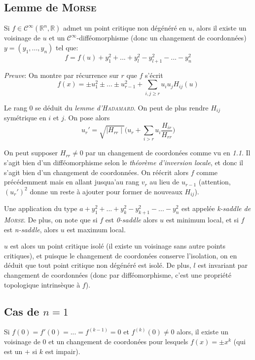 \documentclass{article}
\begin{document}
\subsection{Lemme de \textsc{Morse}}

Si $f\in\mathcal{C}^\infty(\mathbb{R}^n,\mathbb{R})$ admet un point critique non dégénéré en $u$, alors il existe un voisinage de $u$ et un $\mathcal{C}^\infty$-difféomorphisme (donc un changement de coordonnées) $y=(y_1,...,y_n)$ tel que: $$f=f(u)+y_1^2+...+y_l^2-y_{l+1}^2-...-y_n^2$$

\bigskip

\textit{Preuve}: On montre par récurrence sur $r$ que $f$ s'écrit $$f(x)=\pm u_1^2 \pm...\pm u_{r-1}^2 + \sum_{i,j\geq r} u_iu_jH_{ij}(u)$$

Le rang 0 se déduit du \textit{lemme d'\textsc{Hadamard}}. On peut de plus rendre $H_{ij}$ symétrique en $i$ et $j$. On pose alors $$u_r' =\sqrt{\mid H_{rr}\mid}\big(u_r+\sum_{i>r}u_i\frac{H_{ir}}{H_{rr}}\big)$$

On peut supposer $H_{rr}\neq 0$ par un changement de coordonées comme vu en \textit{1.1}. Il s'agit bien d'un difféomorphisme selon le \textit{théorème d'inversion locale}, et donc il s'agit bien d'un changement de coordonnées. On réécrit alors $f$ comme précédemment mais en allant jusqua'au rang $v_r$ au lieu de $u_{r-1}$ (attention, $(u_r')^2$ donne un reste à ajouter pour former de nouveaux $H_{ij}$).

\bigskip

Une application du type $a+y_1^2+...+y_k^2-y_{k+1}^2-...-y_n^2$ est appelée \textit{k-saddle de \textsc{Morse}}. De plus, on note que si $f$ est \textit{0-saddle} alors $u$ est minimum local, et si $f$ est \textit{n-saddle}, alors $u$ est maximum local.

$u$ est alors un point critique isolé (il existe un voisinage sans autre points critiques), et puisque le changement de coordonées conserve l'isolation, on en déduit que tout point critique non dégénéré est isolé. De plus, $l$ est invariant par changement de coordonnées (donc par difféomorphisme, c'est une propriété topologique intrinsèque à $f$).

\subsection{Cas de $n=1$}

Si $f(0)=f'(0)=...=f^{(k-1)}=0$ et $f^{(k)}(0)\neq 0$ alors, il existe un voisinage de 0 et un changement de coordonées pour lesquels $f(x)=\pm x^k$ (qui est un $+$ si $k$ est impair).
\end{document}
